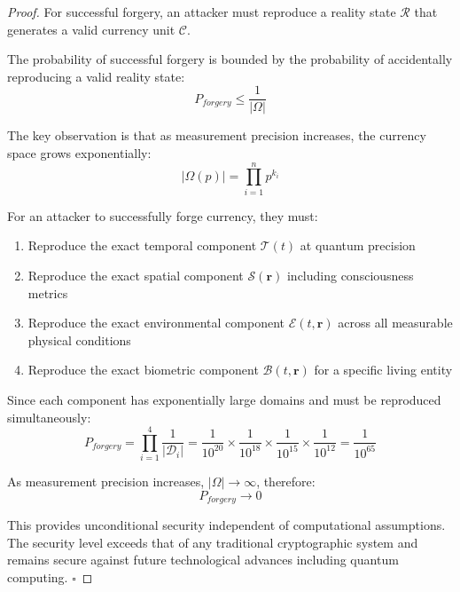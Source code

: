 \documentclass[12pt,a4paper]{article}
\begin{document}
\begin{proof}
For successful forgery, an attacker must reproduce a reality state $\mathcal{R}$ that generates a valid currency unit $\mathcal{C}$.

The probability of successful forgery is bounded by the probability of accidentally reproducing a valid reality state:
\begin{equation}
P_{forgery} \leq \frac{1}{|\Omega|}
\end{equation}

The key observation is that as measurement precision increases, the currency space grows exponentially:
\begin{equation}
|\Omega(p)| = \prod_{i=1}^{n} p^{k_i}
\end{equation}

For an attacker to successfully forge currency, they must:
\begin{enumerate}
\item Reproduce the exact temporal component $\mathcal{T}(t)$ at quantum precision
\item Reproduce the exact spatial component $\mathcal{S}(\mathbf{r})$ including consciousness metrics
\item Reproduce the exact environmental component $\mathcal{E}(t,\mathbf{r})$ across all measurable physical conditions
\item Reproduce the exact biometric component $\mathcal{B}(t,\mathbf{r})$ for a specific living entity
\end{enumerate}

Since each component has exponentially large domains and must be reproduced simultaneously:
\begin{equation}
P_{forgery} = \prod_{i=1}^{4} \frac{1}{|\mathcal{D}_i|} = \frac{1}{10^{20}} \times \frac{1}{10^{18}} \times \frac{1}{10^{15}} \times \frac{1}{10^{12}} = \frac{1}{10^{65}}
\end{equation}

As measurement precision increases, $|\Omega| \to \infty$, therefore:
\begin{equation}
P_{forgery} \to 0
\end{equation}

This provides unconditional security independent of computational assumptions. The security level exceeds that of any traditional cryptographic system and remains secure against future technological advances including quantum computing. $\square$
\end{proof}
\end{document}
